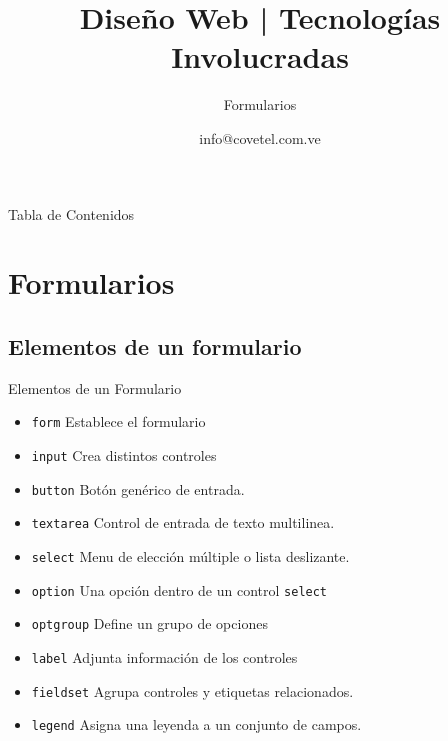 \documentclass{beamer}
\title[WebDesign] {Diseño Web | Tecnologías Involucradas}
\author[Walter Vargas]{ info@covetel.com.ve \inst{1}}
\subtitle{Formularios}
\institute[covetel.com.ve]{ \inst{1} Cooperativa Venezolana de Tecnologías Libres R.S. }
\date
\begin{document}
\begin{frame}
  \titlepage
\end{frame}

\begin{frame}{Tabla de Contenidos} %
\tableofcontents
\end{frame}

\section{Formularios}

\subsection{Elementos de un formulario} %

\begin{frame}{Elementos de un Formulario} %
    \begin{center}
        \begin{itemize}
            \item \texttt{form} Establece el formulario
            \item \texttt{input} Crea distintos controles 
            \item \texttt{button} Botón genérico de entrada. 
            \item \texttt{textarea} Control de entrada de texto multilinea. 
            \item \texttt{select} Menu de elección múltiple o lista deslizante.
            \item \texttt{option} Una opción dentro de un control
            \texttt{select}
            \item \texttt{optgroup} Define un grupo de opciones
            \item \texttt{label} Adjunta información de los controles
            \item \texttt{fieldset} Agrupa controles y etiquetas relacionados.
            \item \texttt{legend} Asigna una leyenda a un conjunto de campos.
        \end{itemize}
    \end{center}
\end{frame}
\end{document}
